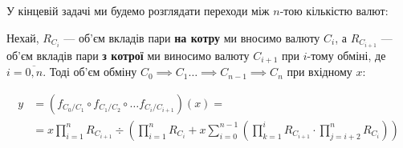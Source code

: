 \documentclass[../index.tex]{subfiles}
\begin{document}
У кінцевій задачі ми будемо розглядати переходи між \(n\)-тою кількістю валют:

\begin{lemma} Нехай, \(R_{C_{i}}\) --- об'єм вкладів пари \textbf{на котру} ми
  вносимо валюту \(C_i\), а \(R_{C_{i+1}}\) --- об'єм вкладів пари \textbf{з
	котрої} ми виносимо валюту \(C_{i+1}\) при \(i\)-тому обміні, де
  \(i = \overline{0, n}\). Тоді об'єм обміну
  \(C_{0} \implies C_{1} \ldots \implies C_{n-1} \implies C_{n} \) при вхідному
  \(x\):

  \begin{equation}\label{eq:nth-swap}
	\begin{aligned}
	  y &= (f_{C_{0}/C_{1}} \circ f_{C_{1}/C_{2}} \circ \ldots f_{C_{i}/C_{i+1}})(x) = \\
	  &= x \prod_{i=1}^n R_{C_{i+1}} \div \left( \prod_{i=1}^{n} R_{C_{i}} + x \sum_{i=0}^{n-1} \left( \prod_{k=1}^i R_{C_{i+1}} \cdot \prod_{j=i+2}^{n}  R_{C_{i}} \right) \right)
	\end{aligned}
	\end{equation}
\end{lemma}
\end{document}

